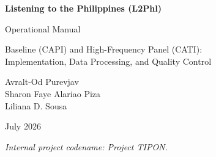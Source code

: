 \documentclass[11pt]{article}
\begin{document}
\begin{titlepage}
\centering
\vspace*{3cm}
{\Huge\bfseries\color{wbnavy} Listening to the Philippines (L2Phl)\par}
\vspace{0.8cm}
{\LARGE\color{wbblue} Operational Manual\par}
\vspace{1.5cm}
{\large Baseline (CAPI) and High-Frequency Panel (CATI):\\[0.3em]
Implementation, Data Processing, and Quality Control\par}
\vspace{2cm}
{\large Avralt-Od Purevjav\\[0.3em] Sharon Faye Alariao Piza\\[0.3em] Liliana D. Sousa\par}
\vspace{1.5cm}
{\large July 2026\par}
\vfill
{\small\itshape Internal project codename: Project TIPON.\par}
\end{titlepage}

\tableofcontents















\end{document}
